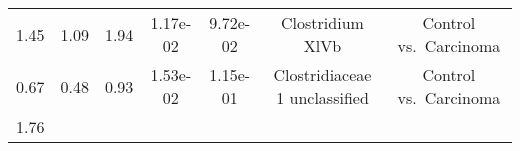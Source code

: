 \documentclass[12pt,]{article}
\begin{document}
\begin{longtable}[]{@{}ccccccc@{}}
\begin{minipage}[t]{0.06\columnwidth}\centering\strut
1.45\strut
\end{minipage} & \begin{minipage}[t]{0.10\columnwidth}\centering\strut
1.09\strut
\end{minipage} & \begin{minipage}[t]{0.10\columnwidth}\centering\strut
1.94\strut
\end{minipage} & \begin{minipage}[t]{0.08\columnwidth}\centering\strut
1.17e-02\strut
\end{minipage} & \begin{minipage}[t]{0.08\columnwidth}\centering\strut
9.72e-02\strut
\end{minipage} & \begin{minipage}[t]{0.23\columnwidth}\centering\strut
Clostridium XlVb\strut
\end{minipage} & \begin{minipage}[t]{0.16\columnwidth}\centering\strut
Control vs.~Carcinoma\strut
\end{minipage}\tabularnewline
\begin{minipage}[t]{0.06\columnwidth}\centering\strut
0.67\strut
\end{minipage} & \begin{minipage}[t]{0.10\columnwidth}\centering\strut
0.48\strut
\end{minipage} & \begin{minipage}[t]{0.10\columnwidth}\centering\strut
0.93\strut
\end{minipage} & \begin{minipage}[t]{0.08\columnwidth}\centering\strut
1.53e-02\strut
\end{minipage} & \begin{minipage}[t]{0.08\columnwidth}\centering\strut
1.15e-01\strut
\end{minipage} & \begin{minipage}[t]{0.23\columnwidth}\centering\strut
Clostridiaceae 1 unclassified\strut
\end{minipage} & \begin{minipage}[t]{0.16\columnwidth}\centering\strut
Control vs.~Carcinoma\strut
\end{minipage}\tabularnewline
\begin{minipage}[t]{0.06\columnwidth}\centering\strut
1.76\strut
\end{minipage} & \begin{minipage}[t]{0.10\columnwidth}\centering\strut

\end{minipage}
\end{longtable}
\end{document}
